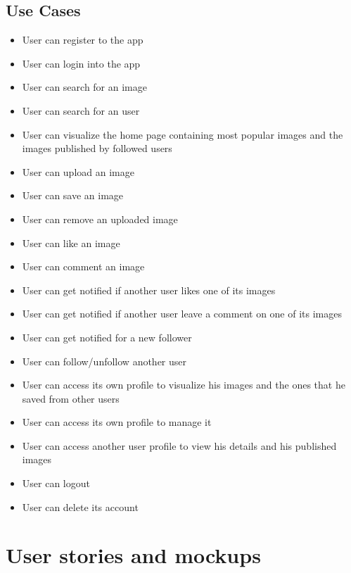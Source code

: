 \documentclass[11pt, a4paper]{article}
\begin{document}
\subsection{Use Cases}
\begin{itemize}
    \item User can register to the app
    \item User can login into the app
    \item User can search for an image 
    \item User can search for an user
    \item User can visualize the home page containing most popular images and the images published by followed users 
    \item User can upload an image
    \item User can save an image
    \item User can remove an uploaded image
    \item User can like an image
    \item User can comment an image
    \item User can get notified if another user likes one of its images
    \item User can get notified if another user leave a comment on one of its images
    \item User can get notified for a new follower
    \item User can follow/unfollow another user
    \item User can access its own profile to visualize his images and the ones that he saved from other users
    \item User can access its own profile to manage it
    \item User can access another user profile to view his details and his published images
    \item User can logout
    \item User can delete its account
\end{itemize}


\newpage

\section{User stories and mockups}
\end{document}
